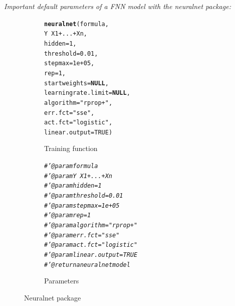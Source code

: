 \documentclass[letter]{article}\usepackage[]{graphicx}\usepackage[]{color}
\makeatletter
\newcommand{\hlnum}[1]{\textcolor[rgb]{0.686,0.059,0.569}{#1}}%
\newcommand{\hlstr}[1]{\textcolor[rgb]{0.192,0.494,0.8}{#1}}%
\newcommand{\hlcom}[1]{\textcolor[rgb]{0.678,0.584,0.686}{\textit{#1}}}%
\newcommand{\hlopt}[1]{\textcolor[rgb]{0,0,0}{#1}}%
\newcommand{\hlstd}[1]{\textcolor[rgb]{0.345,0.345,0.345}{#1}}%
\newcommand{\hlkwa}[1]{\textcolor[rgb]{0.161,0.373,0.58}{\textbf{#1}}}%
\newcommand{\hlkwc}[1]{\textcolor[rgb]{0.333,0.667,0.333}{#1}}%
\newcommand{\hlkwd}[1]{\textcolor[rgb]{0.737,0.353,0.396}{\textbf{#1}}}%
\newenvironment{kframe}{%
 \def\at@end@of@kframe{}%
 \ifinner\ifhmode%
  \def\at@end@of@kframe{\end{minipage}}%
  \begin{minipage}{\columnwidth}%
 \fi\fi%
 \def\FrameCommand##1{\hskip\@totalleftmargin \hskip-\fboxsep
 \colorbox{shadecolor}{##1}\hskip-\fboxsep
     \hskip-\linewidth \hskip-\@totalleftmargin \hskip\columnwidth}%
 \MakeFramed {\advance\hsize-\width
   \@totalleftmargin\z@ \linewidth\hsize
   \@setminipage}}%
 {\par\unskip\endMakeFramed%
 \at@end@of@kframe}
\newenvironment{knitrout}{}{} %
\makeatother
\begin{document}
\textit{Important default parameters of a FNN model with the neuralnet package:}
\begin{figure}[H]
  \begin{subfigure}{0.5\textwidth}
\begin{knitrout}
\color{fgcolor}\begin{kframe}
\begin{alltt}
\hlkwd{neuralnet}\hlstd{(formula,}
      \hlstd{Y}\hlopt{~}\hlstd{X1}\hlopt{+}\hlstd{...}\hlopt{+}\hlstd{Xn,}
      \hlkwc{hidden} \hlstd{=} \hlnum{1}\hlstd{,}
      \hlkwc{threshold} \hlstd{=} \hlnum{0.01}\hlstd{,}
      \hlkwc{stepmax} \hlstd{=} \hlnum{1e+05}\hlstd{,}
      \hlkwc{rep} \hlstd{=} \hlnum{1}\hlstd{,}
      \hlkwc{startweights} \hlstd{=} \hlkwa{NULL}\hlstd{,}
      \hlkwc{learningrate.limit} \hlstd{=} \hlkwa{NULL}\hlstd{,}
      \hlkwc{algorithm} \hlstd{=} \hlstr{"rprop+"}\hlstd{,}
      \hlkwc{err.fct} \hlstd{=} \hlstr{"sse"}\hlstd{,}
      \hlkwc{act.fct} \hlstd{=} \hlstr{"logistic"}\hlstd{,}
      \hlkwc{linear.output} \hlstd{=} \hlnum{TRUE}\hlstd{)}
\end{alltt}
\end{kframe}
\end{knitrout}
    \caption{Training function}
  \end{subfigure}
  \begin{subfigure}{0.5\textwidth}
    \centering
\begin{knitrout}
\color{fgcolor}\begin{kframe}
\begin{alltt}
\hlcom{#' @param formula}
\hlcom{#' @param Y~X1+...+Xn }
\hlcom{#' @param hidden = 1}
\hlcom{#' @param threshold = 0.01}
\hlcom{#' @param stepmax = 1e+05}
\hlcom{#' @param rep = 1}
\hlcom{#' @param algorithm = "rprop+"}
\hlcom{#' @param err.fct = "sse"}
\hlcom{#' @param act.fct = "logistic"}
\hlcom{#' @param linear.output = TRUE}
\hlcom{#' @return a neuralnet model}
\end{alltt}
\end{kframe}
\end{knitrout}
    \caption{Parameters}
  \end{subfigure}
    \caption{Neuralnet package}
\end{figure}
\end{document}
